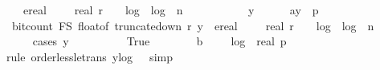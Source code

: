 \begin{isabellebody}
\ \ \ \ ereal\ {\isacharparenleft}{\kern0pt}{}{}\ {\isacharplus}{\kern0pt}\ {}\ {\isacharasterisk}{\kern0pt}\ real\ r\ {\isacharplus}{\kern0pt}\ {}\ {\isacharasterisk}{\kern0pt}\ log\ {}\ {\isacharparenleft}{\kern0pt}log\ {}\ {\isacharparenleft}{\kern0pt}n{\isacharplus}{\kern0pt}{}{\isacharparenright}{\kern0pt}{\isacharparenright}{\kern0pt}{\isacharparenright}{\kern0pt}{\isachardoublequoteclose}\ \isanewline
\ \ \isamarkupfalse%
\ {\isacharminus}{\kern0pt}\isanewline
\ \ \ \ \isamarkupfalse%
\ y\isanewline
\ \ \ \ \isamarkupfalse%
\ a{\isacharcolon}{\kern0pt}{\isachardoublequoteopen}y\ {\isasymin}\ {\isacharbraceleft}{\kern0pt}{}{\isachardot}{\kern0pt}{\isachardot}{\kern0pt}{\isacharless}{\kern0pt}p{\isacharbraceright}{\kern0pt}{\isachardoublequoteclose}\isanewline
\isanewline
\ \ \ \ \isamarkupfalse%
\ {\isachardoublequoteopen}\ bit{\isacharunderscore}{\kern0pt}count\ {\isacharparenleft}{\kern0pt}F\isactrlsub S\ {\isacharparenleft}{\kern0pt}float{\isacharunderscore}{\kern0pt}of\ {\isacharparenleft}{\kern0pt}truncate{\isacharunderscore}{\kern0pt}down\ r\ y{\isacharparenright}{\kern0pt}{\isacharparenright}{\kern0pt}{\isacharparenright}{\kern0pt}\ {\isasymle}\ ereal\ {\isacharparenleft}{\kern0pt}{}{}\ {\isacharplus}{\kern0pt}\ {}\ {\isacharasterisk}{\kern0pt}\ real\ r\ {\isacharplus}{\kern0pt}\ {}\ {\isacharasterisk}{\kern0pt}\ log\ {}\ {\isacharparenleft}{\kern0pt}log\ {}\ {\isacharparenleft}{\kern0pt}n{\isacharplus}{\kern0pt}{}{\isacharparenright}{\kern0pt}{\isacharparenright}{\kern0pt}{\isacharparenright}{\kern0pt}{\isachardoublequoteclose}\ \isanewline
\ \ \ \ \isamarkupfalse%
\ {\isacharparenleft}{\kern0pt}cases\ {\isachardoublequoteopen}y\ {\isasymge}\ {}{\isachardoublequoteclose}{\isacharparenright}{\kern0pt}\isanewline
\ \ \ \ \ \ \isamarkupfalse%
\ True\isanewline
\isanewline
\ \ \ \ \ \ \isamarkupfalse%
\ b{\isacharunderscore}{\kern0pt}{}{\isacharunderscore}{\kern0pt}{}{}{\isacharcolon}{\kern0pt}\ {\isachardoublequoteopen}{}\ {\isacharless}{\kern0pt}\ {}\ {\isacharplus}{\kern0pt}\ log\ {}\ {\isacharparenleft}{\kern0pt}real\ p{\isacharparenright}{\kern0pt}{\isachardoublequoteclose}\ \isanewline
\ \ \ \ \ \ \ \isamarkupfalse%
\ {\isacharparenleft}{\kern0pt}rule\ order{\isacharunderscore}{\kern0pt}less{\isacharunderscore}{\kern0pt}le{\isacharunderscore}{\kern0pt}trans{\isacharbrackleft}{\kern0pt}\ y{\isacharequal}{\kern0pt}{\isachardoublequoteopen}{}{\isacharplus}{\kern0pt}log\ {}\ {}{\isachardoublequoteclose}{\isacharbrackright}{\kern0pt}{\isacharcomma}{\kern0pt}\ simp{\isacharparenright}{\kern0pt}\isanewline

\end{isabellebody}
